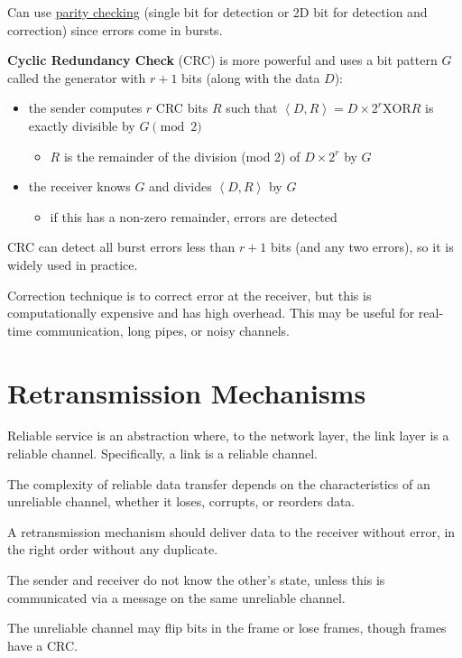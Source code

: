 \documentclass[11pt]{article}
\begin{document}
Can use \uline{parity checking} (single bit for detection or 2D bit for detection and correction)
since errors come in bursts.

\textbf{Cyclic Redundancy Check} (CRC) is more powerful and uses a bit pattern \(G\) called the generator
with \(r+1\) bits (along with the data \(D\)):
\begin{itemize}
\item the sender computes \(r\) CRC bits \(R\) such that \(\left< D, R \right> = D \times 2^{r} \text{XOR} R\)
is exactly divisible by \(G \pmod{2}\)
\begin{itemize}
\item \(R\) is the remainder of the division (mod 2) of \(D \times 2^{r}\) by \(G\)
\end{itemize}
\item the receiver knows \(G\) and divides \(\left< D, R \right>\) by \(G\)
\begin{itemize}
\item if this has a non-zero remainder, errors are detected
\end{itemize}
\end{itemize}

CRC can detect all burst errors less than \(r + 1\) bits (and any two errors), so it is widely used
in practice.

Correction technique is to correct error at the receiver, but this is computationally expensive and has
high overhead.
This may be useful for real-time communication, long pipes, or noisy channels.
\section{Retransmission Mechanisms}
\label{sec:org5d45ee1}
Reliable service is an abstraction where, to the network layer, the link layer is a reliable channel.
Specifically, a link is a reliable channel.

The complexity of reliable data transfer depends on the characteristics of an unreliable channel, whether
it loses, corrupts, or reorders data.

A retransmission mechanism should deliver data to the receiver without error, in the right order without
any duplicate.

The sender and receiver do not know the other's state, unless this is communicated via a message on the
same unreliable channel.

The unreliable channel may flip bits in the frame or lose frames, though frames have a CRC.
\end{document}
